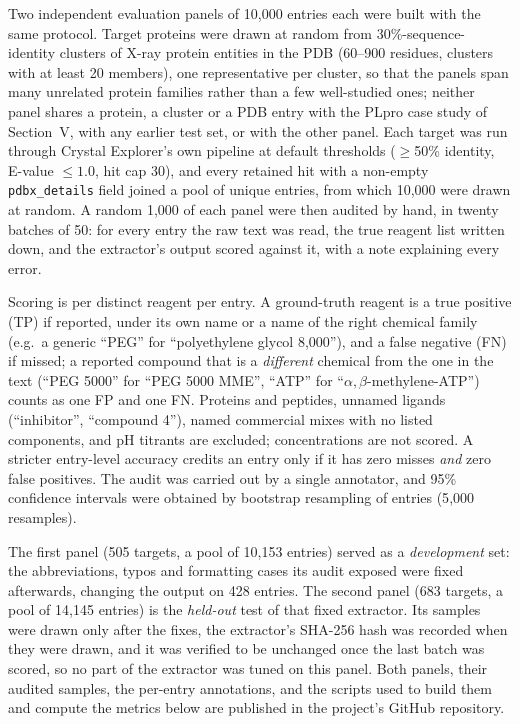 Two independent evaluation panels of 10{,}000 entries each were built
with the same protocol. Target proteins were drawn at random from
30\%-sequence-identity clusters of X-ray protein entities in the PDB
(60--900 residues, clusters with at least 20 members), one
representative per cluster, so that the panels span many unrelated
protein families rather than a few well-studied ones; neither panel
shares a protein, a cluster or a PDB entry with the PLpro case study of
Section~V, with any earlier test set, or with the other panel. Each
target was run through Crystal Explorer's own pipeline at default
thresholds ($\geq$50\% identity, E-value $\leq 1.0$, hit cap 30), and
every retained hit with a non-empty \texttt{pdbx\_details} field joined
a pool of unique entries, from which 10{,}000 were drawn at random.
A random 1{,}000 of each panel were then audited by hand, in twenty
batches of 50: for every entry the raw text was read, the true reagent
list written down, and the extractor's output scored against it, with a
note explaining every error.

Scoring is per distinct reagent per entry. A ground-truth reagent is a
true positive (TP) if reported, under its own name or a name of the
right chemical family (e.g.\ a generic ``PEG'' for ``polyethylene glycol
8{,}000''), and a false negative (FN) if missed; a reported compound that
is a \emph{different} chemical from the one in the text (``PEG 5000'' for
``PEG 5000 MME'', ``ATP'' for ``$\alpha,\beta$-methylene-ATP'') counts as
one FP and one FN. Proteins and peptides, unnamed ligands (``inhibitor'',
``compound 4''), named commercial mixes with no listed components, and
pH titrants are excluded; concentrations are not scored. A stricter
entry-level accuracy credits an entry only if it has zero misses
\emph{and} zero false positives. The audit was carried out by a single
annotator, and 95\% confidence intervals were obtained by bootstrap
resampling of entries (5{,}000 resamples).

The first panel (505 targets, a pool of 10{,}153 entries) served as a
\emph{development} set: the abbreviations, typos and formatting cases its
audit exposed were fixed afterwards, changing the output on 428 entries.
The second panel (683 targets, a pool of 14{,}145 entries) is the
\emph{held-out} test of that fixed extractor. Its samples were drawn
only after the fixes, the extractor's SHA-256 hash was recorded when they
were drawn, and it was verified to be unchanged once the last batch was
scored, so no part of the extractor was tuned on this panel. Both
panels, their audited samples, the per-entry annotations, and the
scripts used to build them and compute the metrics below are published
in the project's GitHub repository.

